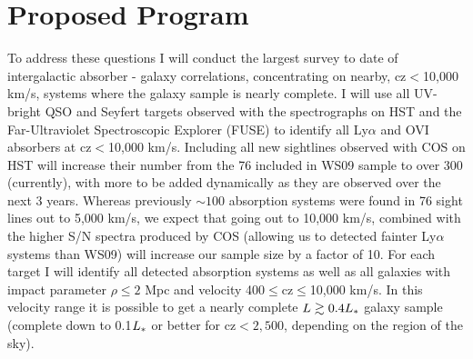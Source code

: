 \documentclass[iop]{emulateapj-rtx4}
\begin{document}


\vspace{5pt}
\section{Proposed Program}

\indent To address these questions I will conduct the largest survey to date of intergalactic absorber - galaxy correlations, concentrating on nearby, cz$<$10,000 km/s, systems where the galaxy sample is nearly complete. I will use all UV-bright QSO and Seyfert targets observed with the spectrographs on HST and the Far-Ultraviolet Spectroscopic Explorer (FUSE) to identify all Ly$\alpha$ and OVI absorbers at cz$<$10,000 km/s. Including all new sightlines observed with COS on HST will increase their number from the 76 included in WS09 sample to over 300 (currently), with more to be added dynamically as they are observed over the next 3 years. Whereas previously $\sim100$ absorption systems were found in 76 sight lines out to 5,000 km/s, we expect that going out to 10,000 km/s, combined with the higher S/N spectra produced by COS (allowing us to detected fainter Ly$\alpha$ systems than WS09) will increase our sample size by a factor of 10.  For each target I will identify all detected absorption systems as well as all galaxies with impact parameter $\rho\leq2$ Mpc and velocity 400$\leq$cz$\leq$10,000 km/s. In this velocity range it is possible to get a nearly complete $L\gtrsim0.4L_{\**}$ galaxy sample (complete down to 0.1$L_{\**}$ or better for cz$<2,500$, depending on the region of the sky). 
\end{document}
